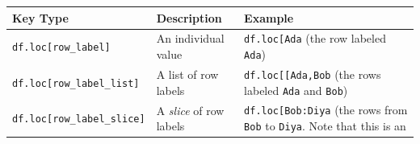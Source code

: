 \documentclass[]{book}
\begin{document}
\begin{longtable}[]{@{}lll@{}}
\toprule
\begin{minipage}[b]{0.05\columnwidth}\raggedright\strut
Key Type\strut
\end{minipage} & \begin{minipage}[b]{0.05\columnwidth}\raggedright\strut
Description\strut
\end{minipage} & \begin{minipage}[b]{0.05\columnwidth}\raggedright\strut
Example\strut
\end{minipage}\tabularnewline
\midrule
\endhead
\begin{minipage}[t]{0.05\columnwidth}\raggedright\strut
\texttt{df.loc{[}row\_label{]}}\strut
\end{minipage} & \begin{minipage}[t]{0.05\columnwidth}\raggedright\strut
An individual value\strut
\end{minipage} & \begin{minipage}[t]{0.05\columnwidth}\raggedright\strut
\texttt{df.loc{[}\textquotesingle{}Ada\textquotesingle{}{]}} (the row
labeled \texttt{Ada})\strut
\end{minipage}\tabularnewline
\begin{minipage}[t]{0.05\columnwidth}\raggedright\strut
\texttt{df.loc{[}row\_label\_list{]}}\strut
\end{minipage} & \begin{minipage}[t]{0.05\columnwidth}\raggedright\strut
A list of row labels\strut
\end{minipage} & \begin{minipage}[t]{0.05\columnwidth}\raggedright\strut
\texttt{df.loc{[}{[}\textquotesingle{}Ada\textquotesingle{},\textquotesingle{}Bob\textquotesingle{}{]}{]}}
(the rows labeled \texttt{Ada} and \texttt{Bob})\strut
\end{minipage}\tabularnewline
\begin{minipage}[t]{0.05\columnwidth}\raggedright\strut
\texttt{df.loc{[}row\_label\_slice{]}}\strut
\end{minipage} & \begin{minipage}[t]{0.05\columnwidth}\raggedright\strut
A \emph{slice} of row labels\strut
\end{minipage} & \begin{minipage}[t]{0.05\columnwidth}\raggedright\strut
\texttt{df.loc{[}\textquotesingle{}Bob\textquotesingle{}:\textquotesingle{}Diya\textquotesingle{}{]}}
(the rows from \texttt{Bob} to \texttt{Diya}. Note that this is an

\end{minipage}
\end{longtable}
\end{document}
